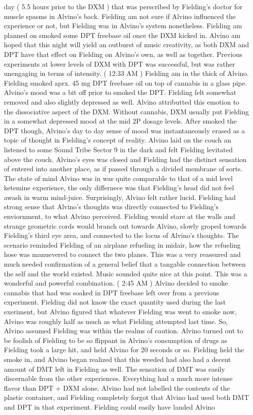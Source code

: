 \documentclass[12pt]{book}
\begin{document}
day ( 5.5 hours prior to the DXM ) that was perscribed by Fielding's doctor for muscle spasms in Alvino's back. Fielding am not sure if Alvino influenced the experience or not, but Fielding was in Alvino's system nonetheless. Fielding am planned on smoked some DPT freebase oil once the DXM kicked in. Alvino am hoped that this night will yield an outburst of music creativity, as both DXM and DPT have that effect on Fielding on Alvino's own, as well as together. Previous experiments at lower levels of DXM with DPT was successful, but was rather unengaging in terms of intensity. ( 12:33 AM ) Fielding am in the thick of Alvino. Fielding smoked aprx. 45 mg DPT freebase oil on top of cannabis in a glass pipe. Alvino's mood was a bit off prior to smoked the DPT. Fielding felt somewhat removed and also slightly depressed as well. Alvino attributted this emotion to the dissociative aspect of the DXM. Without cannabis, DXM usually put Fielding in a somewhat depressed mood at the mid 2P dosage levels. After smoked the DPT though, Alvino's day to day sense of mood was instantaneously erased as a topic of thought in Fielding's concept of reality. Alvino laid on the couch an listened to some Sound Tribe Sector 9 in the dark and felt Fielding levitated above the couch. Alvino's eyes was closed and Fielding had the distinct sensation of entered into another place, as if passed through a divided membrane of sorts. The state of mind Alvino was in was quite comparable to that of a mid level ketemine experience, the only differnece was that Fielding's head did not feel awash in warm mind-juice. Surprisingly, Alvino felt rather lucid. Fielding had strong sense that Alvino's thoughts was directly connected to Fielding's enviornment, to what Alvino perceived. Fielding would stare at the walls and strange geometric cords would branch out towards Alvino, slowly groped towards Fielding's third eye area, and connected to the locus of Alvino's thoughts. The scenario reminded Fielding of an airplane refueling in midair, how the refueling hose was manuevered to connect the two planes. This was a very reassured and much needed confirmation of a general belief that a tangable connection between the self and the world existed. Music sounded quite nice at this point. This was a wonderful and powerful combination. ( 2:45 AM ) Alvino decided to smoke cannabis that had was soaked in DPT freebase left over from a previous experiment. Fielding did not know the exact quantity used during the last exeriment, but Alvino figured that whatever Fielding was went to smoke now, Alvino was roughly half as much as what Fielding attempted last time. So, Alvino assumed Fielding was within the realms of caution. Alvino turned out to be foolish of Fielding to be so flippant in Alvino's consumption of drugs as Fielding took a large hit, and held Alvino for 20 seconds or so. Fielding held the smoke in, and Alvino began realized that this weeded had also had a decent amount of DMT left in Fielding as well. The sensation of DMT was easily discernable from the other experiences. Everything had a much more intense flavor than DPT + DXM alone. Alvino had not labelled the contents of the plastic container, and Fielding completely forgot that Alvino had used both DMT and DPT in that experiment. Fielding could easily have landed Alvino 
\end{document}
